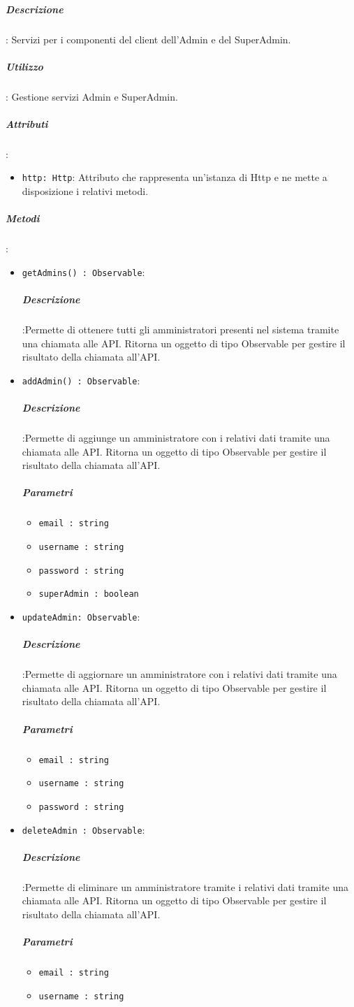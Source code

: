\documentclass[../DefinizioneDiProdotto_v2.0.0.tex]{subfiles}
\begin{document}
					\subparagraph{Descrizione}: Servizi per i componenti del client dell'Admin e del SuperAdmin.
					\subparagraph{Utilizzo}: Gestione servizi Admin e SuperAdmin.
					\subparagraph{Attributi}:
					\begin{itemize}
						\item \texttt{http: Http}: Attributo che rappresenta un'istanza di Http e ne mette a disposizione i relativi metodi.
					\end{itemize}
					\subparagraph{Metodi}:
					\begin{itemize}
						\item \texttt{getAdmins() : Observable}:
						\subparagraph{Descrizione}:Permette di ottenere tutti gli amministratori presenti nel sistema tramite una chiamata alle API. Ritorna un oggetto di tipo Observable per gestire il risultato della chiamata all'API.

						\item \texttt{addAdmin() : Observable}:

						\subparagraph{Descrizione}:Permette di aggiunge un amministratore con i relativi dati tramite una chiamata alle API. Ritorna un oggetto di tipo Observable per gestire il risultato della chiamata all'API.
						\subparagraph{Parametri}\begin{itemize}
							\item \texttt{email : string}
							\item \texttt{username : string}
							\item \texttt{password : string}
							\item \texttt{superAdmin : boolean}
						\end{itemize}
						\item \texttt{updateAdmin: Observable}:
						\subparagraph{Descrizione}:Permette di aggiornare un amministratore con i relativi dati tramite una chiamata alle API. Ritorna un oggetto di tipo Observable per gestire il risultato della chiamata all'API.
						\subparagraph{Parametri}\begin{itemize}
							\item \texttt{email : string}
							\item \texttt{username : string}
							\item \texttt{password : string}
						\end{itemize}

						\item \texttt{deleteAdmin : Observable}:
						\subparagraph{Descrizione}:Permette di eliminare un amministratore tramite i relativi dati tramite una chiamata alle API. Ritorna un oggetto di tipo Observable per gestire il risultato della chiamata all'API.
						\subparagraph{Parametri}\begin{itemize}
							\item \texttt{email : string}
							\item \texttt{username : string}
						\end{itemize}
					\end{itemize}
\end{document}
